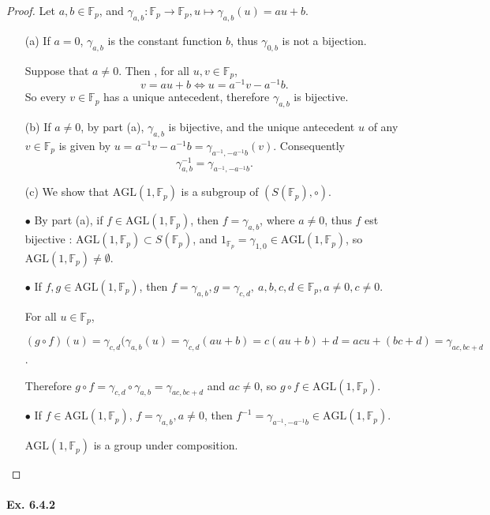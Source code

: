 \documentclass[11pt,a4paper]{article}
\newcommand{\F}{\mathbb{F}}
\begin{document}
\begin{proof}

Let $a,b\in \mathbb{F}_p$, and $\gamma_{a,b} : \F_p\to \F_p, u\mapsto \gamma_{a,b}(u) = au+b$.
\begin{enumerate}
\item[(a)]  If $a=0$, $\gamma_{a,b}$ is the constant function  $b$, thus $\gamma_{0,b}$ is not a bijection.

Suppose that $a\neq 0$. Then , for all $u,v \in \F_p$, 
$$v=au+b \iff u = a^{-1}v - a^{-1} b.$$
So every $v \in \F_p$ has a unique antecedent, therefore $\gamma_{a,b}$ is bijective.

\item[(b)]
If $a\neq 0$, by part (a), $\gamma_{a,b}$ is bijective, and the unique antecedent $u$ of any $v\in \F_p$ is given by $u = a^{-1}v - a^{-1} b = \gamma_{a^{-1}, -a^{-1}b}(v)$.
Consequently
$$\gamma_{a,b}^{-1} =  \gamma_{a^{-1}, -a^{-1}b}.$$

\item[(c)]
We show that $\mathrm{AGL}(1,\F_p)$ is a subgroup of $(S(\F_p),\circ)$.

$\bullet$ By part (a), if $f \in\mathrm{AGL}(1,\F_p)$, then $f = \gamma_{a,b}$, where $a\neq 0$, thus $f$ est bijective :  $\mathrm{AGL}(1,\F_p) \subset S(\F_p)$, and $1_{\F_p} = \gamma_{1,0} \in \mathrm{AGL}(1,\F_p)$, so $\mathrm{AGL}(1,\F_p) \ne \emptyset$.

$\bullet$ If $f,g \in \mathrm{AGL}(1,\F_p)$, then $f = \gamma_{a,b}, g=\gamma_{c,d},\ a,b,c,d \in \F_p, a\neq 0, c\neq 0$.

For all $u \in \F_p$, 

$(g\circ f)(u) = \gamma_{c,d}(\gamma_{a,b}(u) = \gamma_{c,d}(au+b) = c(au+b)+d = ac u +(bc+d) = \gamma_{ac,bc+d}$.

Therefore $g \circ f =  \gamma_{c,d} \circ \gamma_{a,b} = \gamma_{ac,bc+d}$ and $ac \neq 0$, so $g\circ f \in \mathrm{AGL}(1,\F_p)$.

$\bullet$ If  $f \in \mathrm{AGL}(1,\F_p)$, $f = \gamma_{a,b},a\neq 0$, then $f^{-1} =  \gamma_{a^{-1}, -a^{-1}b} \in \mathrm{AGL}(1,\F_p)$.

$\mathrm{AGL}(1,\F_p)$ is a group under composition.
\end{enumerate}
\end{proof}

\paragraph{Ex. 6.4.2}
\end{document}
